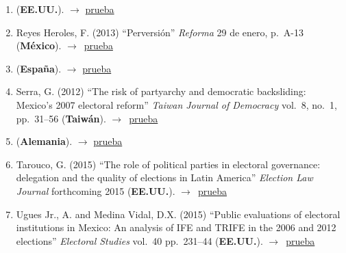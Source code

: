 \documentclass[12 pt, letter]{article}
\newenvironment{CitasMiTrabajo}{
    \begin{footnotesize}
    \begin{enumerate}[label={\footnotesize\emph{cita~\arabic*}},ref=\arabic*] %
        \setlength{\itemsep}{.1\itemsep}
        \setlength{\parskip}{.1\parskip}
    }{\end{enumerate}\end{footnotesize}}
\begin{document}
\begin{CitasMiTrabajo}
        \item {} (\textbf{EE.UU.}).  $\rightarrow$ \href{https://github.com/emagar/cv/blob/master/citasMiTrab/estevezEtalElecStud/resendiz2014.pdf}{prueba}

        \item Reyes Heroles, F. (2013)
            ``Perversi\'on''
            \emph{Reforma}
            29 de enero, p.\ A-13 (\textbf{M\'exico}). $\rightarrow$~\href{https://github.com/emagar/cv/blob/master/citasMiTrab/estevezEtalElecStud/reyesHeroles2013.pdf}{prueba}

        \item {} (\textbf{Espa\~na}).  $\rightarrow$ \href{https://github.com/emagar/cv/blob/master/citasMiTrab/estevezEtalElecStud/martinTrife2012amlh.pdf}{prueba}

        \item Serra, G. (2012)
            ``The risk of partyarchy and democratic backsliding: Mexico's 2007 electoral reform''
            \emph{Taiwan Journal of Democracy}
            vol.\ 8, no.\ 1, pp.\ 31--56 (\textbf{Taiw\'an}). $\rightarrow$~\href{https://github.com/emagar/cv/blob/master/citasMiTrab/estevezEtalElecStud/serraElecRefMexico2012tjd.pdf}{prueba}

        \item {} (\textbf{Alemania}).  $\rightarrow$ \href{https://github.com/emagar/cv/blob/master/citasMiTrab/estevezEtalElecStud/serraDemiseResurrection2013jpla.pdf}{prueba}

       \item Tarouco, G. (2015)
            ``The role of political parties in electoral governance: delegation and the quality of elections in Latin America'' 
            \emph{Election Law Journal} forthcoming 2015  (\textbf{EE.UU.}). $\rightarrow$~\href{https://github.com/emagar/cv/blob/master/citasMiTrab/estevezEtalElecStud/taroucoRolePtiesEllGovernance2015elj.pdf}{prueba}

        \item Ugues Jr., A. and Medina Vidal, D.X. (2015)
            ``Public evaluations of electoral institutions in Mexico: An analysis of IFE and TRIFE in the 2006 and 2012 elections''
            \emph{Electoral Studies}
            vol.\ 40 pp.\ 231--44 (\textbf{EE.UU.}). $\rightarrow$~\href{https://github.com/emagar/cv/blob/master/citasMiTrab/estevezEtalElecStud/ugues.medinaPubEvalElectoralInstitutionsMexico2015es.excerpt.pdf}{prueba}


\end{CitasMiTrabajo}
\end{document}
